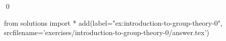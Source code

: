 
    \begin{ex}
  \label{ex:introduction-to-group-theory-0}
  
  \qed
\end{ex}
\begin{python0}
from solutions import *
add(label="ex:introduction-to-group-theory-0",
    srcfilename='exercises/introduction-to-group-theory-0/answer.tex') 
\end{python0}                              
